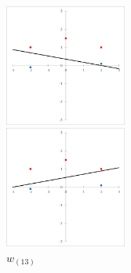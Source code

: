 \begin{figure}[H]
    \begin{minipage}{0.3\hsize}
        \begin{center}
            \includegraphics[width=40mm]{./figures/section_2/image12.eps}
            \captionsetup{labelformat=empty,labelsep=none}
            \caption{$w_{(12)}$}
        \end{center}
    \end{minipage}
    \begin{minipage}{0.3\hsize}
        \begin{center}
            \includegraphics[width=40mm]{./figures/section_2/image13.eps}
            \captionsetup{labelformat=empty,labelsep=none}
            \caption{$w_{(13)}$}
        \end{center}
    \end{minipage}
\end{figure}
